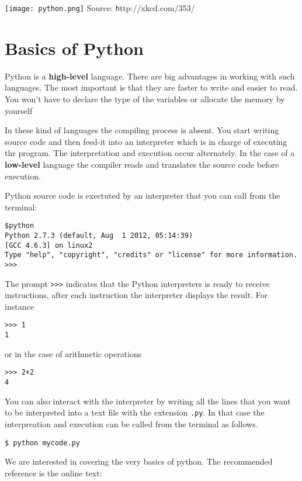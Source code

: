 \documentclass{article}
\begin{document}
\setcounter{section}{2}
\begin{center}
\texttt{[image: python.png]}
Source: {\texttt http://xkcd.com/353/}
\end{center}
\section{Basics of Python}
Python is a {\bf high-level} language. There are big advantages in
working with such languages. The most important is that they are
faster to write and easier to read. You won't have to declare the type
of the variables or allocate the memory by yourself  

In these kind of languages the compiling process is absent. You start
writing source code and then feed-it into an interpreter which is in
charge of executing thr program. The interpretation and execution
occur alternately. In the case of a {\bf low-level} language the
compiler reads and translates the source code before execution. 

Python source code is exectuted by an interpreter that you can call
from the terminal: 
\begin{verbatim}
$python
Python 2.7.3 (default, Aug  1 2012, 05:14:39) 
[GCC 4.6.3] on linux2
Type "help", "copyright", "credits" or "license" for more information. 
>>> 
\end{verbatim}

The prompt \verb">>>" indicates that the Python interpreters is ready
to receive instructions, after each instruction the interpreter
displays the result. For instance 

\begin{verbatim}
>>> 1
1
\end{verbatim}

or in the case of arithmetic operations

\begin{verbatim}
>>> 2+2
4
\end{verbatim}

You can also interact with the interpreter by writing all the lines
that you want to be interpreted into a text file with the extension
\verb".py". In that case the interpreation and execution can be called
from the terminal as follows. 

\begin{verbatim}
$ python mycode.py
\end{verbatim}

We are interested in covering the very basics of python. The recommended reference is the online text:
\end{document}
